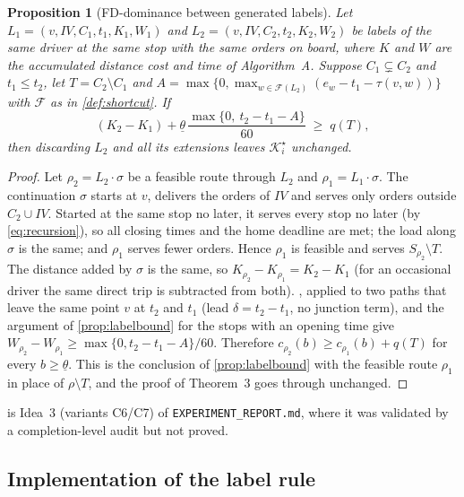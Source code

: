 \documentclass[11pt]{article}
\newtheorem{proposition}{Proposition}
\theoremstyle{definition}
\theoremstyle{remark}
\newcommand{\Ks}{\mathcal{K}^{\star}}
\newcommand{\thl}{\underline{\theta}}
\begin{document}
\begin{proposition}[FD-dominance between generated labels]\label{prop:fddom}
Let $L_1=(v,IV,C_1,t_1,K_1,W_1)$ and $L_2=(v,IV,C_2,t_2,K_2,W_2)$ be labels of
the same driver at the same stop with the same orders on board, where $K$ and
$W$ are the accumulated distance cost and time of Algorithm~A. Suppose
$C_1\subsetneq C_2$ and $t_1\le t_2$, let $T=C_2\setminus C_1$ and
$A=\max\{0,\max_{w\in\mathcal F(L_2)}(e_w-t_1-\tau(v,w))\}$ with $\mathcal F$ as
in \cref{def:shortcut}. If
\[
(K_2-K_1)+\thl\,\frac{\max\{0,\ t_2-t_1-A\}}{60}\;\ge\;q(T),
\]
then discarding $L_2$ and all its extensions leaves $\Ks_i$ unchanged.
\end{proposition}

\begin{proof}
Let $\rho_2=L_2\cdot\sigma$ be a feasible route through $L_2$ and
$\rho_1=L_1\cdot\sigma$. The continuation $\sigma$ starts at $v$, delivers the
orders of $IV$ and serves only orders outside $C_2\cup IV$. Started at the same
stop no later, it serves every stop no later (by \eqref{eq:recursion}), so all
closing times and the home deadline are met; the load along $\sigma$ is the same;
and $\rho_1$ serves fewer orders. Hence $\rho_1$ is feasible and serves
$S_{\rho_2}\setminus T$. The distance added by $\sigma$ is the same, so
$K_{\rho_2}-K_{\rho_1}=K_2-K_1$ (for an occasional driver the same direct trip is
subtracted from both). , applied to two paths that leave the
same point $v$ at $t_2$ and $t_1$ (lead $\delta=t_2-t_1$, no junction term), and
the argument of \cref{prop:labelbound} for the stops with an opening time give
$W_{\rho_2}-W_{\rho_1}\ge\max\{0,t_2-t_1-A\}/60$. Therefore
$c_{\rho_2}(b)\ge c_{\rho_1}(b)+q(T)$ for every $b\ge\thl$. This is the
conclusion of \cref{prop:labelbound} with the feasible route $\rho_1$ in place of
$\rho\setminus T$, and the proof of Theorem~3 goes through unchanged.
\end{proof}

 is Idea~3 (variants C6/C7) of \texttt{EXPERIMENT\_REPORT.md}, where it
was validated by a completion-level audit but not proved.

\subsection{Implementation of the label rule}
\end{document}
